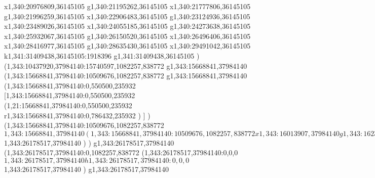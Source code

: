 {x1,340:20976809,36145105
g1,340:21195262,36145105
x1,340:21777806,36145105
g1,340:21996259,36145105
x1,340:22906483,36145105
g1,340:23124936,36145105
x1,340:23489026,36145105
x1,340:24055185,36145105
g1,340:24273638,36145105
x1,340:25932067,36145105
g1,340:26150520,36145105
x1,340:26496406,36145105
x1,340:28416977,36145105
g1,340:28635430,36145105
x1,340:29491042,36145105
k1,341:31409438,36145105:1918396
g1,341:31409438,36145105
)
(1,343:10437920,37984140:15740597,1082257,838772
g1,343:15668841,37984140
(1,343:15668841,37984140:10509676,1082257,838772
g1,343:15668841,37984140
(1,343:15668841,37984140:0,550500,235932
[1,343:15668841,37984140:0,550500,235932
(1,21:15668841,37984140:0,550500,235932
r1,343:15668841,37984140:0,786432,235932
)
]
)
(1,343:15668841,37984140:10509676,1082257,838772
$1,343:15668841,37984140
(1,343:15668841,37984140:10509676,1082257,838772
x1,343:16013907,37984140
g1,343:16234178,37984140
x1,343:16743904,37984140
g1,343:16925944,37984140
[1,343:16925944,37984140:946633,1082257,838772
(1,343:16925944,37164937:946633,197518,0
k1,343:17237278,37164937:311334
x1,343:17561244,37164937
k1,343:17872577,37164937:311333
)
(1,343:16925944,37984140:946633,688132,360452
(1,343:16925944,37361544:946633,65536,983048
x1,343:17872577,37361544
)
)
(1,343:16925944,38757376:946633,303558,0
k1,343:16974773,38757376:48829
x1,343:17823748,38757376
k1,343:17872577,38757376:48829
)
]
g1,343:17981801,37984140
x1,343:18326867,37984140
(1,343:18326867,38082443:218188,303558,0
x1,343:18512287,38082443
)
g1,343:19855777,37984140
(1,343:19855777,37984140:1055861,455111,0
(1,343:19855777,37984140:1055861,455111,0
x1,343:20911638,37984140
)
)
g1,343:21566999,37984140
x1,343:21879585,37984140
x1,343:22810589,37984140
g1,343:22992629,37984140
x1,343:23502355,37984140
g1,343:23684395,37984140
[1,343:23684395,37984140:946633,1082257,838772
(1,343:23684395,37164937:946633,197518,0
k1,343:23995729,37164937:311334
x1,343:24319695,37164937
k1,343:24631028,37164937:311333
)
(1,343:23684395,37984140:946633,688132,360452
(1,343:23684395,37361544:946633,65536,983048
x1,343:24631028,37361544
)
)
(1,343:23684395,38757376:946633,303558,0
k1,343:23733224,38757376:48829
x1,343:24582199,38757376
k1,343:24631028,38757376:48829
)
]
g1,343:24740252,37984140
x1,343:25052838,37984140
(1,343:25052838,38082443:218188,303558,0
x1,343:25238258,38082443
)
x1,343:26178517,37984140
)
$1,343:26178517,37984140
)
)
g1,343:26178517,37984140
(1,343:26178517,37984140:0,1082257,838772
(1,343:26178517,37984140:0,0,0
$1,343:26178517,37984140
h1,343:26178517,37984140:0,0,0
$1,343:26178517,37984140
)
g1,343:26178517,37984140
}
